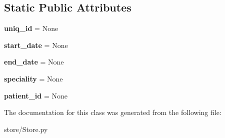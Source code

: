 \subsection*{Static Public Attributes}
\begin{DoxyCompactItemize}
\item 
\hypertarget{classstore_1_1_store_1_1_admission_a0ef8ef5a0d8beb8a706f0bd5976e09cc}{{\bfseries uniq\-\_\-id} = None}\label{classstore_1_1_store_1_1_admission_a0ef8ef5a0d8beb8a706f0bd5976e09cc}

\item 
\hypertarget{classstore_1_1_store_1_1_admission_adbf8ea26eced6c5f3899d6720761f394}{{\bfseries start\-\_\-date} = None}\label{classstore_1_1_store_1_1_admission_adbf8ea26eced6c5f3899d6720761f394}

\item 
\hypertarget{classstore_1_1_store_1_1_admission_ab7d1763436a416d1f56156bfa422d76a}{{\bfseries end\-\_\-date} = None}\label{classstore_1_1_store_1_1_admission_ab7d1763436a416d1f56156bfa422d76a}

\item 
\hypertarget{classstore_1_1_store_1_1_admission_abaa3579507fc2334c02e1f48facb4148}{{\bfseries speciality} = None}\label{classstore_1_1_store_1_1_admission_abaa3579507fc2334c02e1f48facb4148}

\item 
\hypertarget{classstore_1_1_store_1_1_admission_a3fae38d373802e4814a8404dfd2f5f8d}{{\bfseries patient\-\_\-id} = None}\label{classstore_1_1_store_1_1_admission_a3fae38d373802e4814a8404dfd2f5f8d}

\end{DoxyCompactItemize}


The documentation for this class was generated from the following file\-:\begin{DoxyCompactItemize}
\item 
store/Store.\-py\end{DoxyCompactItemize}
